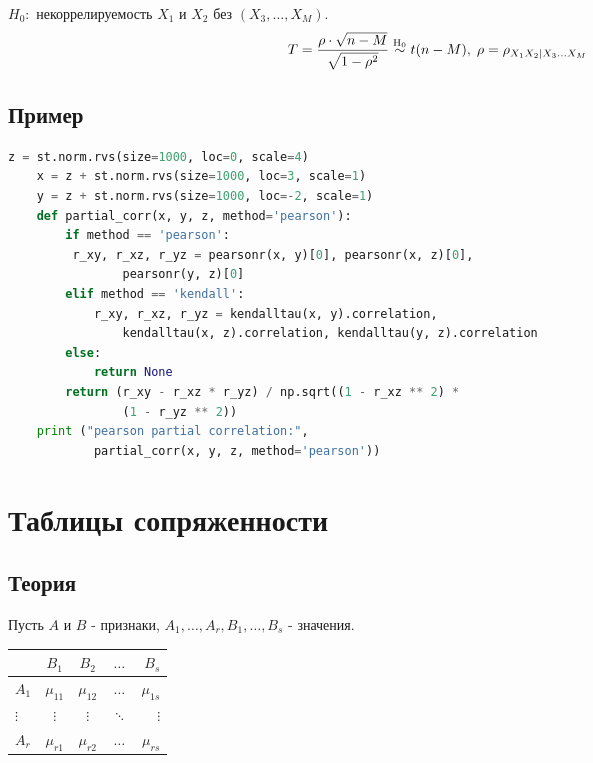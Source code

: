 $H_0:$ некоррелируемость $X_1$ и $X_2$ без $(X_3, \dots, X_M)$.
$$T = \frac{\rho \cdot \sqrt{n-M}}{\sqrt{1-\rho^2}} \mathrel{\stackrel{\rm H_0}\sim} t(n-M), \; \rho = \rho_{X_1 X_2 | X_3 \dots X_M}$$

\subsection*{Пример}\label{cha:corr/sec:chast/subsec:prob}

\begin{lstlisting}[language=Python]
	z = st.norm.rvs(size=1000, loc=0, scale=4) 
	x = z + st.norm.rvs(size=1000, loc=3, scale=1)
	y = z + st.norm.rvs(size=1000, loc=-2, scale=1)
	def partial_corr(x, y, z, method='pearson'):
    	if method == 'pearson':
       	 r_xy, r_xz, r_yz = pearsonr(x, y)[0], pearsonr(x, z)[0], 
       	 		pearsonr(y, z)[0]
    	elif method == 'kendall':
        	r_xy, r_xz, r_yz = kendalltau(x, y).correlation, 
        		kendalltau(x, z).correlation, kendalltau(y, z).correlation
   		else:
        	return None
    	return (r_xy - r_xz * r_yz) / np.sqrt((1 - r_xz ** 2) * 
    			(1 - r_yz ** 2))
    print ("pearson partial correlation:", 
    		partial_corr(x, y, z, method='pearson'))
\end{lstlisting}

\section{Таблицы сопряженности}\label{cha:corr/sec:contingency}

\subsection*{Теория}\label{cha:corr/sec:contingency/subsec:theory}

Пусть $A$ и $B$ - признаки, $A_1, \dots, A_r, B_1, \dots, B_s$ - значения. 

\begin{center}
	\begin{tabular}{| l || c | c | c | r |}
	\hline
	 & $B_1$ & $B_2$ & $\dots$ & $B_s$ \\ \hline \hline
	 $A_1$ & $\mu_{11}$ & $\mu_{12}$ & $\dots$ & $\mu_{1s}$ \\ \hline
	 $\vdots$ & $\vdots$ & $\vdots$ & $\ddots$ & $\vdots$ \\ \hline
	 $A_r$ & $\mu_{r1}$ & $\mu_{r2}$ & $\dots$ & $\mu_{rs}$ \\ \hline
	\end{tabular}
\end{center}


